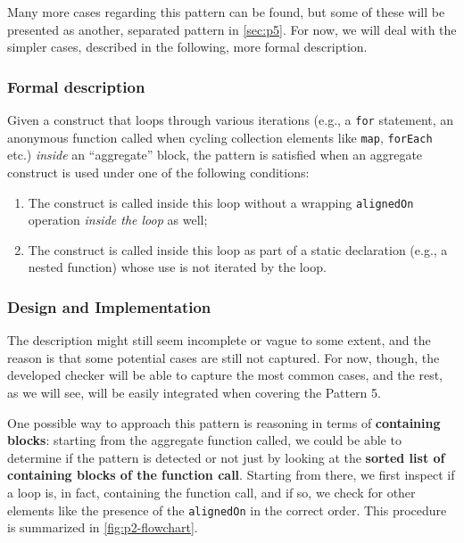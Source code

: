 \documentclass[12pt,a4paper,openright,twoside]{book}
\begin{document}
Many more cases regarding this pattern can be found, but some of these will be
presented as another, separated pattern in \cref{sec:p5}. For now, we will deal
with the simpler cases, described in the following, more formal description.

\subsubsection{Formal description}

Given a construct that loops through various iterations (e.g., a \lstinline{for}
statement, an anonymous function called when cycling collection elements like
\lstinline{map}, \lstinline{forEach} etc.) \emph{inside} an ``aggregate'' block,
the pattern is satisfied when an aggregate construct is used under one of the
following conditions:
\begin{enumerate}
  \item The construct is called inside this loop without a wrapping
  \lstinline{alignedOn} operation \emph{inside the loop} as well;
  \item The construct is called inside this loop as part of a static declaration
  (e.g., a nested function) whose use is not iterated by the loop.
\end{enumerate}

\subsubsection{Design and Implementation}

The description might still seem incomplete or vague to some extent, and the
reason is that some potential cases are still not captured. For now, though, the
developed checker will be able to capture the most common cases, and the rest,
as we will see, will be easily integrated when covering the Pattern 5. 

One possible way to approach this pattern is reasoning in terms of
\textbf{containing blocks}: starting from the aggregate function called, we
could be able to determine if the pattern is detected or not just by looking at
the \textbf{sorted list of containing blocks of the function call}. Starting
from there, we first inspect if a loop is, in fact, containing the function
call, and if so, we check for other elements like the presence of the
\lstinline{alignedOn} in the correct order. This procedure is summarized in
\cref{fig:p2-flowchart}.
\end{document}
